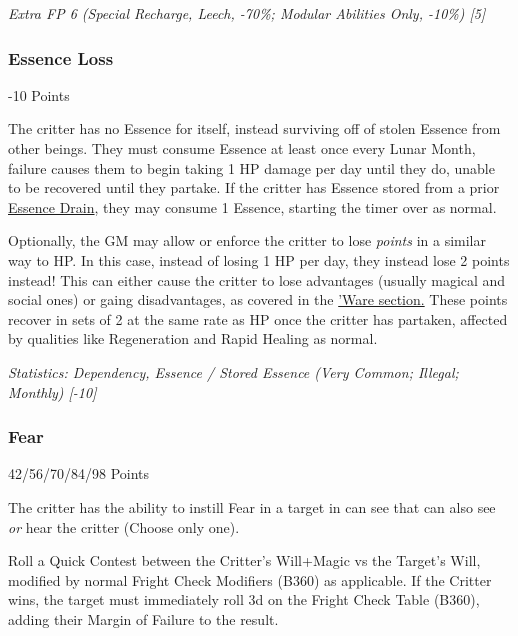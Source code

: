 \begin{multicols*}{3}
	 \textcolor{OliveGreen}{\textit{ Extra FP 6 (Special Recharge, Leech, -70\%; Modular Abilities Only, -10\%) [5] }}
	 
	 
	 \subsubsection{Essence Loss}\label{essence_loss}
	 \begin{flushright}
	 	-10 Points
	 \end{flushright}
 
 	The critter has no Essence for itself, instead surviving off of stolen Essence from other beings. They must consume Essence at least once every Lunar Month, failure causes them to begin taking 1 HP damage per day until they do, unable to be recovered until they partake. If the critter has Essence stored from a prior \hyperref[essence_drain]{Essence Drain}, they may consume 1 Essence, starting the timer over as normal.
 	
 	Optionally, the GM may allow or enforce the critter to lose \textit{points} in a similar way to HP. In this case, instead of losing 1 HP per day, they instead lose 2 points instead! This can either cause the critter to lose advantages (usually magical and social ones) or gaing disadvantages, as covered in the \hyperref[ware]{'Ware section.} These points recover in sets of 2 at the same rate as HP once the critter has partaken, affected by qualities like Regeneration and Rapid Healing as normal.
 
 	\textcolor{OliveGreen}{\textit{Statistics: Dependency, Essence / Stored Essence (Very Common; Illegal; Monthly) [-10] }}
	
	\subsubsection{Fear}\label{fear}
	\begin{flushright}
		42/56/70/84/98 Points
	\end{flushright}
	
	The critter has the ability to instill Fear in a target in can see that can also see \textit{or} hear the critter (Choose only one). 
	
	Roll a Quick Contest between the Critter's Will+Magic vs the Target's Will, modified by normal Fright Check Modifiers (B360) as applicable. If the Critter wins, the target must immediately roll 3d on the Fright Check Table (B360), adding their Margin of Failure to the result.
	

\end{multicols*}
